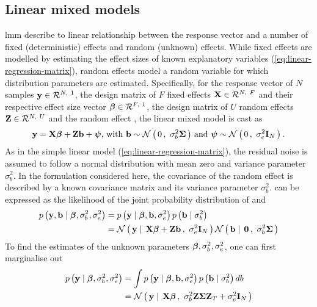\subsection{Linear mixed models}
\label{subsection:lmm}
\gls{lmm} describe to linear relationship between the response vector and a number of fixed (deterministic) effects and random (unknown) effects. While fixed effects are modelled by estimating the effect sizes of known explanatory variables (\cref{eq:linear-regression-matrix}), random effects model a random variable for which distribution parameters are estimated. Specifically, for the response vector of \(N\) samples \(\boldsymbol{\mathbf{y}} \in \mathcal{R}^{N,~1}\), the design matrix of \(F\) fixed effects \(\boldsymbol{\mathbf{X}} \in \mathcal{R}^{N,~F}\) and their respective effect size vector \(\boldsymbol{\mathbf{\beta}} \in \mathcal{R}^{F,~1}\), the design matrix of \(U\) random effects \(\boldsymbol{\mathbf{Z}} \in \mathcal{R}^{N,~U}\) and the random effect , the linear mixed model is cast as
%
\begin{equation}
\boldsymbol{\mathbf{y}} =\boldsymbol{\mathbf{X}}\boldsymbol{\mathbf{\beta}} +\boldsymbol{\mathbf{Z}}\boldsymbol{\mathbf{b}}+\boldsymbol{\mathbf{\psi}},\, \text{with } \boldsymbol{\mathbf{b}} \sim \mathcal{N}\left(\,{0}\,,~{\sigma_b^2\boldsymbol{\mathbf{\Sigma}}}\,\right)\,\text{and  }\boldsymbol{\mathbf{\psi}} \sim\mathcal{N}\left(\,{0}\,,~{\sigma_e^2\boldsymbol{\mathbf{I}}_N}\,\right).
\label{eq:lmm}
\end{equation}
%
As in the simple linear model (\cref{eq:linear-regression-matrix}), the residual noise is assumed to follow a normal distribution with mean zero and variance parameter \(\sigma_b^2\). In the formulation considered here, the covariance of the random effect is described by a known covariance matrix \tmat{\Sigma} and its variance parameter \(\sigma_b^2\). 
%
 can be expressed as the likelihood  of the joint probability distribution of  and 
\begin{align}
p\left(\boldsymbol{\mathbf{y}}, \boldsymbol{\mathbf{b}}\mid \boldsymbol{\mathbf{\beta}},\sigma_b^2, \sigma_e^2\right) &= p\left(\boldsymbol{\mathbf{y}} \mid \boldsymbol{\mathbf{\beta}}, \boldsymbol{\mathbf{b}}, \sigma_e^2\right)p\left(\boldsymbol{\mathbf{b}}\mid \sigma_b^2\right) \label{eq:lmm-prob} \\
&= \mathcal{N}\left(\,{\boldsymbol{\mathbf{y}} \mid \, \boldsymbol{\mathbf{X\beta}} + \boldsymbol{\mathbf{Zb}}}\,,~{\sigma_e^2\boldsymbol{\mathbf{I}}_{N}}\,\right) \mathcal{N}\left(\,{\boldsymbol{\mathbf{b}} \mid \,\boldsymbol{\mathbf{0}}}\,,~{\sigma_b^2\boldsymbol{\mathbf{\Sigma}}}\,\right)\label{eq:lmm-norm}
\end{align}
%
To find the estimates of the unknown parameters \(\boldsymbol{\mathbf{\beta}}, \sigma_b^2, \sigma_e^2\), one can first marginalise out  
%
\begin{align}
p\left(\boldsymbol{\mathbf{y}} \mid \boldsymbol{\mathbf{\beta}},\sigma_b^2, \sigma_e^2\right) &= \int p\left(\boldsymbol{\mathbf{y}} \mid \boldsymbol{\mathbf{\beta}}, \boldsymbol{\mathbf{b}}, \sigma_e^2\right)p\left(\boldsymbol{\mathbf{b}}\mid \sigma_b^2\right) db \label{eq:lmm-marginal-prob} \\
&= \mathcal{N}\left(\,{\boldsymbol{\mathbf{y}} \mid  \, \boldsymbol{\mathbf{X\beta}}}\,,~{\sigma_b^2\boldsymbol{\mathbf{Z}}\boldsymbol{\mathbf{\Sigma}}\boldsymbol{\mathbf{Z}}_{T} + \sigma_e^2\boldsymbol{\mathbf{I}}_{N}}\,\right)  \label{eq:lmm-marginal-norm} 
\end{align}
